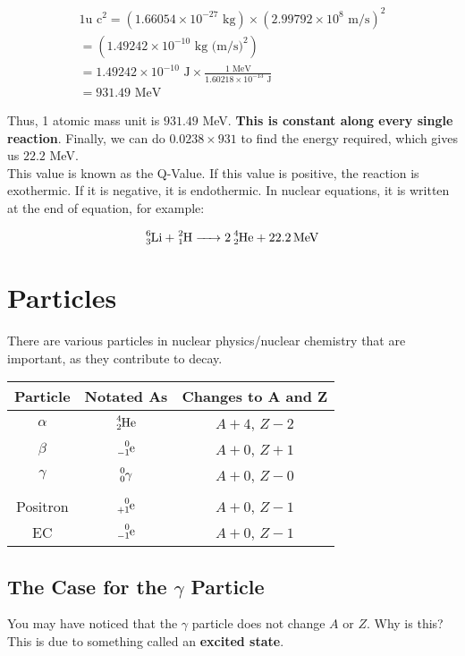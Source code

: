 \documentclass{article}
\begin{document}
\begin{multicols*}{2}
    \begin{equation*}
      \begin{split}
        1 \text{u c}^2 = (1.66054 \times 10^{-27} \text{ kg}) \times (2.99792 \times 10^{8} \text{ m/s})^2\\
        = (1.49242 \times 10^{-10} \text{ kg (m/s)}^2)\\
        = 1.49242 \times 10^{-10} \text{ J} \times
        \frac{1 \text{ MeV}}{1.60218 \times 10^{-13} \text{ J}}\\
        = 931.49 \text{ MeV}
      \end{split}
    \end{equation*}

    Thus, 1 atomic mass unit is $931.49$ MeV. \textbf{This is constant along
    every single reaction}. Finally, we can do $0.0238 \times 931$ to find the
    energy required, which gives us $22.2$ MeV.\\

    This value is known as the Q-Value. If this value is positive, the reaction
    is exothermic. If it is negative, it is endothermic. In nuclear equations,
    it is written at the end of equation, for example:

    \[
      \ce{^6_3Li + ^2_1H -> 2 ^4_2He + 22.2 MeV}
    \]

    \section{Particles}
    There are various particles in nuclear physics/nuclear chemistry that are
    important, as they contribute to decay.\\

    \begin{tabular}{|c|c|c|}
      \hline
      Particle & Notated As & Changes to A and Z \\
      \hline
      $\alpha$ & $\ce{^4_2He}$ & $A+4$, $Z-2$ \\
      $\beta$ & $\ce{^0_-1e}$ & $A+0$, $Z+1$ \\
      $\gamma$ & $\ce{^0_0\gamma}$ & $A+0$, $Z-0$\\
       &  &   \\
      Positron & $\ce{^0_{+1}e}$ & $A+0$, $Z-1$\\
      EC & $\ce{^0_-1e}$ & $A+0$, $Z-1$\\
      \hline
    \end{tabular}

    \subsection{The Case for the $\gamma$ Particle}
    You may have noticed that the $\gamma$ particle does not change $A$ or $Z$.
    Why is this? This is due to something called an \textbf{excited state}.
    

\end{multicols*}
\end{document}

